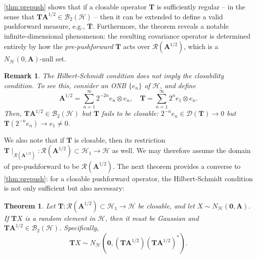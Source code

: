 \documentclass[noinfoline]{imsart}\setcounter{tocdepth}{2}
\newcommand{\m}[1]{\mathbf{#1}} %
\renewcommand{\c}[1]{\mathcal{#1}} %
\theoremstyle{plain}
\newtheorem{theorem}{Theorem}[section]
\newtheorem{remark}{Remark}[section]
\begin{document}
\cref{thm:prepush} shows that if a closable operator $\m{T}$ is sufficiently regular -- in the sense that $\m{T} \m{A}^{1/2} \in \c{B}_{2}(\c{H})$ -- then it can be extended to define a valid pushforward measure, e.g., $\overline{\m{T}}$. Furthermore, the theorem reveals a notable infinite-dimensional phenomenon: the resulting covariance operator is determined entirely by how the \emph{pre-pushforward} $\m{T}$
acts over $\c{R}(\m{A}^{1/2})$, which is a $N_{\c{H}}(0, \m{A})$-null set. 

\begin{remark}\label{rmk:close:break} 
The Hilbert-Schmidt condition does not imply the closability condition. To see this, consider an ONB $\{e_{n}\}$ of $\c{H}$, and define
\begin{equation*}
    \m{A}^{1/2} = \sum_{n=1}^{\infty} 2^{-2n} e_{n} \otimes e_{n}, \quad \m{T} = \sum_{n = 1}^{\infty} 2^{n} e_{1} \otimes e_{n}.
\end{equation*}
Then, $\m{T} \m{A}^{1/2} \in \c{B}_{2}(\c{H})$ but $\m{T}$ fails to be closable: $2^{-n} e_{n} \in \c{D}(\m{T}) \to 0$ but $\m{T} (2^{-n} e_{n}) \rightarrow e_{1} \neq 0$.
\end{remark}

We also note that if $\m{T}$ is closable, then its restriction $\m{T} \mid_{\c{R}(\m{A}^{1/2})}: \c{R}(\m{A}^{1/2}) \subset \c{H}_{1} \rightarrow \c{H}$ as well. We may therefore assume the domain of pre-pushforward to be $\c{R}(\m{A}^{1/2})$. The next theorem provides a converse to \cref{thm:prepush}: for a closable pushforward operator, the Hilbert-Schmidt condition is not only sufficient but also necessary:

\begin{theorem}\label{thm:trans:closed}
Let $\m{T} : \c{R}(\m{A}^{1/2}) \subset \c{H}_{1} \rightarrow \c{H}$ be closable, and let $X \sim N_{\c{H}}(\m{0}, \m{A})$. If $\m{T} X$ is a random element in $\c{H}$, then it must be Gaussian and $\m{T} \m{A}^{1/2} \in \c{B}_{2}(\c{H})$. 
Specifically,
\begin{equation*}
    \m{T} X \sim N_{\c{H}}(\m{0}, (\m{T} \m{A}^{1/2})(\m{T} \m{A}^{1/2})^{*}).
\end{equation*}
\end{theorem}
\end{document}
